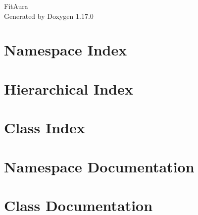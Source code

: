 \documentclass[twoside]{book}
\newcommand{\+}{\discretionary{\mbox{\scriptsize$\hookleftarrow$}}{}{}}
\newcommand{\clearemptydoublepage}{%
    \newpage{\pagestyle{empty}\cleardoublepage}%
  }
\begin{document}
  \raggedbottom
    \hypersetup{pageanchor=false,
                bookmarksnumbered=true,
                pdfencoding=unicode
               }
  \begin{titlepage}
  \vspace*{7cm}
  \begin{center}%
  {\Large Fit\+Aura}\\
  \vspace*{1cm}
  {\large Generated by Doxygen 1.17.0}\\
  \end{center}
  \end{titlepage}
  \clearemptydoublepage
  \tableofcontents
  \clearemptydoublepage
  \hypersetup{pageanchor=true}


\chapter{Namespace Index}

\chapter{Hierarchical Index}

\chapter{Class Index}

\chapter{Namespace Documentation}

\chapter{Class Documentation}


  \backmatter
  \newpage
  \clearemptydoublepage
  \printindex
\end{document}
